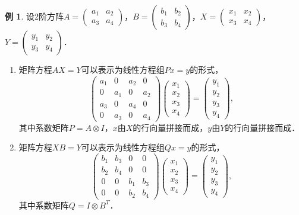 \documentclass[a4paper,fontset=windows]{ctexbook}
\theoremstyle{definition}
\newtheorem{example}{例}[chapter]
\begin{document}
\begin{example}\label{ex2.12}
设2阶方阵$A=\begin{pmatrix}a_1&a_2 \\ a_3&a_4\end{pmatrix}$，$B=\begin{pmatrix}b_1&b_2 \\ b_3&b_4\end{pmatrix}$，$X=\begin{pmatrix}x_1&x_2 \\ x_3&x_4\end{pmatrix}$，$Y=\begin{pmatrix}y_1&y_2 \\ y_3&y_4\end{pmatrix}$．
\begin{enumerate}
\item 矩阵方程$AX=Y$可以表示为线性方程组$Px=y$的形式，
$$\begin{pmatrix}a_1&0&a_2&0 \\ 0&a_1&0&a_2 \\ a_3&0&a_4&0 \\ 0&a_3&0&a_4\end{pmatrix}\begin{pmatrix}x_1 \\ x_2 \\ x_3 \\ x_4\end{pmatrix}=\begin{pmatrix}y_1 \\ y_2 \\ y_3 \\ y_4\end{pmatrix},$$
其中系数矩阵$P=A\otimes I$，$x$由$X$的行向量拼接而成，$y$由$Y$的行向量拼接而成．

\item 矩阵方程$XB=Y$可以表示为线性方程组$Qx=y$的形式，
$$\begin{pmatrix}b_1&b_3&0&0 \\ b_2&b_4&0&0 \\ 0&0&b_1&b_3 \\ 0&0&b_2&b_4\end{pmatrix}\begin{pmatrix}x_1 \\ x_2 \\ x_3 \\ x_4\end{pmatrix}=\begin{pmatrix}y_1 \\ y_2 \\ y_3 \\ y_4\end{pmatrix},$$
其中系数矩阵$Q=I\otimes B^T$．


\end{enumerate}
\end{example}
\end{document}
